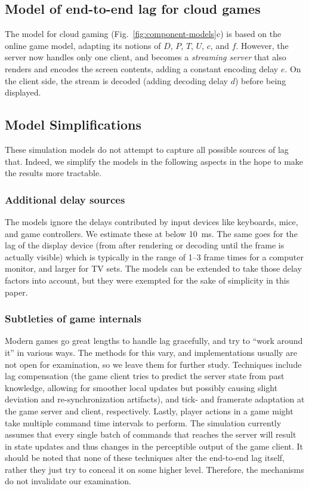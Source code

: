 \subsection{Model of end-to-end lag for cloud games}
The model for cloud gaming (Fig.~\ref{fig:component-models}c) is based on the online game model, adapting its notions of $D$, $P$, $T$, $U$, $c$, and $f$. However, the server now handles only one client, and becomes a \textit{streaming server} that also renders and encodes the screen contents, adding a constant encoding delay $e$. On the client side, the stream is decoded (adding decoding delay $d$) before being displayed.



\subsection{Model Simplifications}

These simulation models do not attempt to capture all possible sources of lag that. Indeed, we simplify the models in the following aspects in the hope to make the results more tractable.

\subsubsection{Additional delay sources}
The models ignore the delays contributed by input devices like keyboards, mice, and game controllers. We estimate these at below \SI{10}{\milli\second}. The same goes for the lag of the display device (from after rendering or decoding until the frame is actually visible) which is typically in the range of 1--3 frame times for a computer monitor, and larger for TV sets. The models can be extended to take those delay factors into account, but they were exempted for the sake of simplicity in this paper.

\subsubsection{Subtleties of game internals}
Modern games go great lengths to handle lag gracefully, and try to ``work around it'' in various ways. The methods for this vary, and implementations usually are not open for examination, so we leave them for further study. Techniques include lag compensation (the game client tries to predict the server state from past knowledge, allowing for smoother local updates but possibly causing slight deviation and re-synchronization artifacts), and tick- and framerate adaptation at the game server and client, respectively. Lastly, player actions in a game might take multiple command time intervals to perform. The simulation currently assumes that every single batch of commands that reaches the server will result in state updates and thus changes in the perceptible output of the game client. It should be noted that none of these techniques alter the end-to-end lag itself, rather they just try to conceal it on some higher level. Therefore, the mechanisms do not invalidate our examination.

